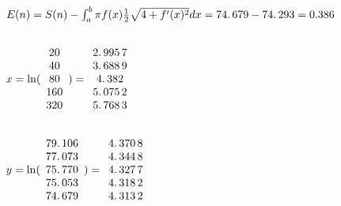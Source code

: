 \documentclass{article}
\begin{document}
\subsection{$E(n)=S(n)-\protect\int_{a}^{b}\protect\pi f(x)\frac{1}{2}%
\protect\sqrt{4+f^{\prime }(x)^{2}}dx=\allowbreak 74.\,\allowbreak
679\allowbreak -\allowbreak \allowbreak 74.\,\allowbreak 293=\allowbreak
0.386\,$}

\subsection{$x=\ln (%
\protect\begin{array}{c}
20\protect \\ 
40\protect \\ 
80\protect \\ 
160\protect \\ 
320%
\protect\end{array}%
)=\allowbreak 
\protect\begin{array}{c}
2.\,\allowbreak 995\,7\protect \\ 
3.\,\allowbreak 688\,9\protect \\ 
4.\,\allowbreak 382\protect \\ 
5.\,\allowbreak 075\,2\protect \\ 
5.\,\allowbreak 768\,3%
\protect\end{array}%
\allowbreak $}

\subsection{$y=\ln (%
\protect\begin{array}{c}
79.\,\allowbreak 106\allowbreak \protect \\ 
77.\,\allowbreak 073\protect \\ 
\allowbreak 75.\,\allowbreak 770\protect \\ 
75.\,\allowbreak 053\allowbreak \protect \\ 
\allowbreak 74.\,\allowbreak 679%
\protect\end{array}%
)=\allowbreak 
\protect\begin{array}{c}
4.\,\allowbreak 370\,8\protect \\ 
4.\,\allowbreak 344\,8\protect \\ 
4.\,\allowbreak 327\,7\protect \\ 
4.\,\allowbreak 318\,2\protect \\ 
4.\,\allowbreak 313\,2%
\protect\end{array}%
\allowbreak $}
\end{document}
